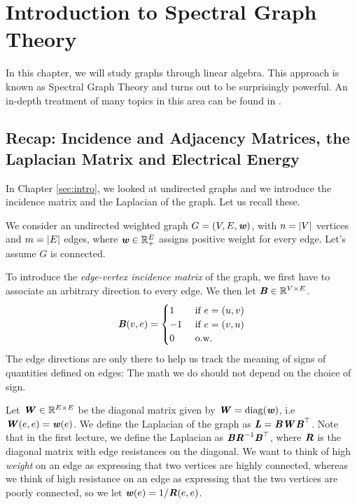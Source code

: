 
\chapter{Introduction to Spectral Graph Theory}



%
\sloppy

In this chapter, we will study graphs through linear algebra. This
approach is known as Spectral Graph Theory and turns out to be
surprisingly powerful.
An in-depth treatment of many topics in this area can be found in \cite{S19}.

\section{Recap: Incidence and Adjacency Matrices, the Laplacian
  Matrix and Electrical Energy}

In Chapter \ref{sec:intro}, we looked at undirected graphs and we introduce the
incidence matrix and the Laplacian of the graph. Let us recall these.

We consider an undirected weighted graph $G=(V, E, \boldsymbol{\mathit{w}})$, with
$n=\left|V \right|$ vertices and $m = \left|E \right|$ edges, where $\boldsymbol{\mathit{w}} \in
\mathbb{R}_+^E$ assigns positive weight for every edge.
Let's assume $G$ is connected.

To introduce the \emph{edge-vertex incidence matrix} of the graph,
we first have to associate an arbitrary direction to every edge.
We then let
$\boldsymbol{\mathit{B}} \in \mathbb{R}^{V \times E}$.
\[
  \boldsymbol{\mathit{B}}(v,e) =
  \begin{cases}
    1 & \text{ if } e = (u,v) \\
    -1 &\text{ if } e = (v,u) \\
    0 &\text{ o.w.}
  \end{cases}
\]
The edge directions are only there to help us track the meaning of signs of
quantities defined on edges: The math we do should not depend on the
choice of sign.

Let $\boldsymbol{\mathit{W}} \in \mathbb{R}^{E \times E}$ be the diagonal matrix given by $\boldsymbol{\mathit{W}} =
\operatorname*{diag}(\boldsymbol{\mathit{w}})$, i.e $\boldsymbol{\mathit{W}}(e,e) = \boldsymbol{\mathit{w}}(e)$.
We define the Laplacian of the graph as $\boldsymbol{\mathit{L}} = \boldsymbol{\mathit{B}}\boldsymbol{\mathit{W}}\boldsymbol{\mathit{B}}^{\top}$.
Note that in the first lecture, we define the Laplacian as
$\boldsymbol{\mathit{B}}\boldsymbol{\mathit{R}}^{-1}\boldsymbol{\mathit{B}}^{\top}$,
where $\boldsymbol{\mathit{R}}$ is the diagonal matrix with edge resistances on the
diagonal.
We want to think of high \emph{weight} on an edge as expressing that two
vertices are highly connected, whereas we think of high resistance on
an edge as expressing that the two vertices are poorly connected, so
we let $\boldsymbol{\mathit{w}}(e) = 1/\boldsymbol{\mathit{R}}(e,e)$.

